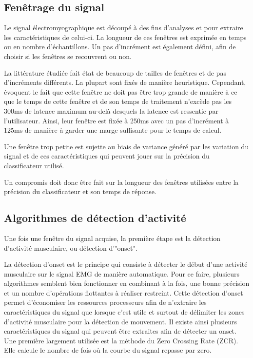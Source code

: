 \documentclass[letterpaper, twoside, 12pt, memoire, creativecommons, hyperref]{thETS}
\begin{document}
\subsection{Fenêtrage du signal}

Le signal électromyographique est découpé à des fins d'analyses et pour extraire les caractéristiques de celui-ci. La longueur de ces fenêtres est exprimée en temps ou en nombre d'échantillons. Un pas d’incrément est également défini, afin de choisir si les fenêtres se recouvrent ou non. 

La littérature étudiée fait état de beaucoup de tailles de fenêtres et de pas d’incréments différents. La plupart sont fixés de manière heuristique. Cependant, \cite{Englehart2003} évoquent le fait que cette fenêtre ne doit pas être trop grande de manière à ce que le temps de cette fenêtre et de son temps de traitement n’excède pas les 300ms de latence maximum au-delà desquels la latence est ressentie par l’utilisateur. Ainsi, leur fenêtre est fixée à 250ms avec un pas d’incrément à 125ms de manière à garder une marge suffisante pour le temps de calcul. 

Une fenêtre trop petite est sujette au biais de variance généré par les variation du signal et de ces caractéristiques qui peuvent jouer sur la précision du classificateur utilisé.

Un compromis doit donc être fait sur la longueur des fenêtres utilisées entre la  précision du classificateur et son temps de réponse.

\subsection{Algorithmes de détection d'activité}

Une fois une fenêtre du signal acquise, la première étape est la détection d'activité musculaire, ou détection d'"onset". 

La détection d’onset est le principe qui consiste à détecter le début d’une activité musculaire sur le signal EMG de manière automatique.  Pour ce faire, plusieurs algorithmes semblent bien fonctionner en combinant à la fois, une bonne précision et un nombre d’opérations flottantes à réaliser restreint. Cette détection d’onset permet d’économiser les ressources processeurs afin  de n’extraire les caractéristiques du signal que lorsque c’est utile et surtout de délimiter les zones d’activité musculaire pour la détection de mouvement. 
Il existe ainsi plusieurs caractéristiques du signal qui peuvent être extraites afin de détecter un onset. Une première largement utilisée \citep{Chang1996, Englehart2003, Tenore2007}est la méthode du Zero Crossing Rate (ZCR). Elle calcule le nombre de fois où la courbe du signal repasse par zero. 
\end{document}
